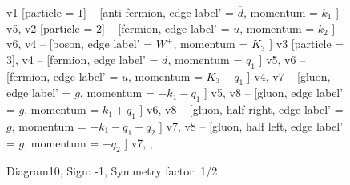 \documentclass{revtex4}
\begin{document}
\begin{figure}[!htb]
\begin{center}
{    %
v1 [particle = \(1\)] -- [anti fermion, edge label' = \(\overline{d}\), momentum = \(k_{1}\) ] v5, 
v2 [particle = \(2\)] -- [fermion, edge label' = \(u\), momentum = \(k_{2}\) ] v6, 
v4 -- [boson, edge label' = \(W^{+}\), momentum = \(K_{3}\) ] v3 [particle = \(3\)], 
v4 -- [fermion, edge label' = \(d\), momentum = \(q_{1}\) ] v5, 
v6 -- [fermion, edge label' = \(u\), momentum = \(K_{3} + q_{1}\) ] v4, 
v7 -- [gluon, edge label' = \(g\), momentum = \(-k_{1} - q_{1}\) ] v5, 
v8 -- [gluon, edge label' = \(g\), momentum = \(k_{1} + q_{1}\) ] v6, 
v8 -- [gluon, half right, edge label' = \(g\), momentum = \(-k_{1} - q_{1} + q_{2}\) ] v7, 
v8 -- [gluon, half left, edge label' = \(g\), momentum = \(-q_{2}\) ] v7, 
};
\end{center}
\caption{Diagram10, Sign: -1, Symmetry factor: 1/2}
\end{figure}
\newpage
\end{document}
